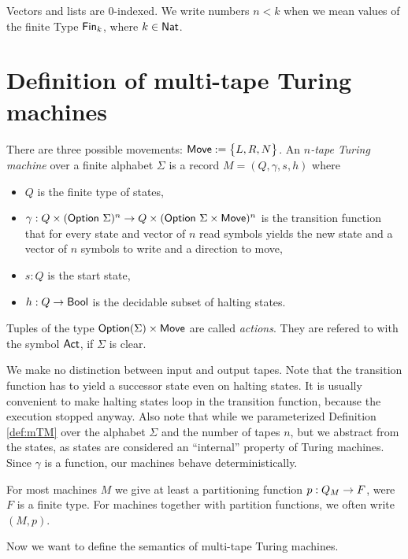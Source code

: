 \documentclass{psartcl}
\begin{document}
Vectors and lists are $0$-indexed.  We write numbers $n < k$ when we mean values of the finite Type $\textsf{Fin}_k$, where $k\in\textsf{Nat}$.

\section{Definition of multi-tape Turing machines}
\label{sec:def}

\begin{definition}
  \label{def:mTM}
  There are three possible movements:  $\textsf{Move} := \bigl\{ L, R, N \bigr \}$.
  An \emph{$n$-tape Turing machine} over a finite alphabet $\Sigma$ is a record $M = (Q, \gamma, s, h)$ where
  \begin{itemize}
    \item $Q$ is the finite type of states,
    \item $\gamma : Q \times (\textsf{Option}~\Sigma)^n \rightarrow Q \times (\textsf{Option}~\Sigma \times \textsf{Move})^n$ is the transition function that for every state and
      vector of $n$ read symbols yields the new state and a vector of $n$ symbols to write and a direction to move,
    \item $s:Q$ is the start state,
    \item $h : Q \rightarrow \textsf{Bool}$ is the decidable subset of halting states.
  \end{itemize}

  Tuples of the type $\textsf{Option}(\Sigma) \times \textsf{Move}$ are called \emph{actions}.  They are refered to with the symbol $\textsf{Act}$, if $\Sigma$ is clear.
\end{definition}

We make no distinction between input and output tapes.  Note that the transition function has to yield a successor state even on halting states.  It
is usually convenient to make halting states loop in the transition function, because the execution stopped anyway.  Also note that while we
parameterized Definition \ref{def:mTM} over the alphabet $\Sigma$ and the number of tapes $n$, but we abstract from the states, as states are
considered an ``internal'' property of Turing machines.  Since $\gamma$ is a function, our machines behave deterministically.

For most machines $M$ we give at least a partitioning function $p : Q_M \rightarrow F$, were $F$ is a finite type.
For machines together with partition functions, we often write $(M, p)$.

Now we want to define the semantics of multi-tape Turing machines.
\end{document}
